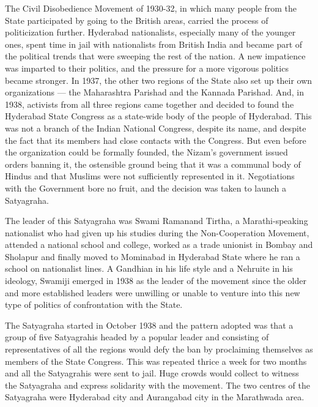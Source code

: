 The Civil Disobedience Movement of 1930-32, in which many people from the State participated by going to the British areas, carried the process of politicization further. Hyderabad nationalists, especially many of the younger ones, spent time in jail with nationalists from British India and became part of the political trends that were sweeping the rest of the nation. A new impatience was imparted to their politics, and the pressure for a more vigorous politics became stronger. In 1937, the other two regions of the State also set up their own organizations — the Maharashtra Parishad and the Kannada Parishad. And, in 1938, activists from all three regions came together and decided to found the Hyderabad State Congress as a state-wide body of the people of Hyderabad. This was not a branch of the Indian National Congress, despite its name, and despite the fact that its members had close contacts with the Congress. But even before the organization could be formally founded, the Nizam's government issued orders banning it, the ostensible ground being that it was a communal body of Hindus and that Muslims were not sufficiently represented in it. Negotiations with the Government bore no fruit, and the decision was taken to launch a Satyagraha. 

The leader of this Satyagraha was Swami Ramanand Tirtha, a Marathi-speaking nationalist who had given up his studies during the Non-Cooperation Movement, attended a national school and college, worked as a trade unionist in Bombay and Sholapur and finally moved to Mominabad in Hyderabad State where he ran a school on nationalist lines. A Gandhian in his life­ style and a Nehruite in his ideology, Swamiji emerged in 1938 as the leader of the movement since the older and more established leaders were unwilling or unable to venture into this new type of politics of confrontation with the State. 

The Satyagraha started in October 1938 and the pattern adopted was that a group of five Satyagrahis headed by a popular leader and consisting of representatives of all the regions would defy the ban by proclaiming themselves as members of the State Congress. This was repeated thrice a week for two months and all the Satyagrahis were sent to jail. Huge crowds would collect to witness the Satyagraha and express solidarity with the movement. The two centres of the Satyagraha were Hyderabad city and Aurangabad city in the Marathwada area. 

